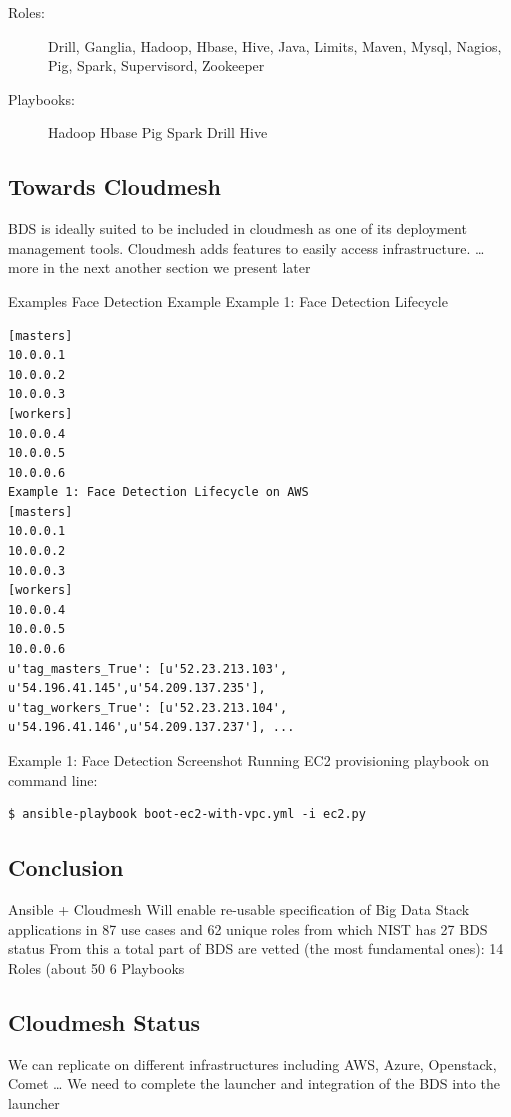 \begin{description}

\item[Roles:]
Drill,
Ganglia,
Hadoop,
Hbase,
Hive,
Java,
Limits,
Maven,
Mysql,
Nagios,
Pig,
Spark,
Supervisord,
Zookeeper

\item[Playbooks:]
Hadoop
Hbase
Pig
Spark
Drill
Hive
\end{description}

\subsection{Towards Cloudmesh}
BDS is ideally suited to be included in cloudmesh as one of its deployment management tools. Cloudmesh adds features to easily access infrastructure.
  … more in the next another section we present later

Examples
Face Detection Example
Example 1: Face Detection Lifecycle
\begin{Verbatim}
[masters]
10.0.0.1
10.0.0.2
10.0.0.3
[workers]
10.0.0.4
10.0.0.5
10.0.0.6
Example 1: Face Detection Lifecycle on AWS
[masters]
10.0.0.1
10.0.0.2
10.0.0.3
[workers]
10.0.0.4
10.0.0.5
10.0.0.6
u'tag_masters_True': [u'52.23.213.103', u'54.196.41.145',u'54.209.137.235'],
u'tag_workers_True': [u'52.23.213.104', u'54.196.41.146',u'54.209.137.237'], ...
\end{Verbatim}

Example 1: Face Detection Screenshot Running EC2 provisioning playbook
on command line:

\begin{Verbatim}
$ ansible-playbook boot-ec2-with-vpc.yml -i ec2.py
\end{Verbatim}

\subsection{Conclusion}
Ansible + Cloudmesh
Will enable re-usable specification of Big Data Stack applications in 87 use cases and 62 unique roles from which NIST has 27
BDS status
From this a total part of BDS are vetted (the most fundamental ones): 
14 Roles  (about 50%
6   Playbooks

\subsection{Cloudmesh Status}
We can replicate on different infrastructures including AWS, Azure, Openstack, Comet …
We need to complete the launcher and integration of the BDS into the launcher






